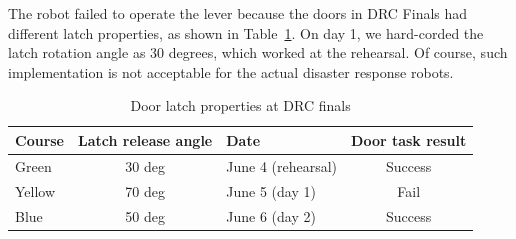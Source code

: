 The robot failed to operate the lever because the doors in DRC Finals had different
latch properties, as shown in Table~\ref{tbl:door_latch}.
On day 1, we hard-corded the latch rotation angle as 30 degrees,
which worked at the rehearsal.
Of course, such implementation is not acceptable for the actual disaster response robots.
%
\begin{table}[htb]
\caption{Door latch properties at DRC finals} \label{tbl:door_latch}
\begin{tabular}{lclc}
\hline
Course & Latch release angle & Date & Door task result  \\ 
\hline
Green & 30 deg & June 4 (rehearsal) & Success  \\
Yellow & 70 deg & June 5 (day 1) & Fail \\
Blue &  50 deg & June 6 (day 2)  & Success \\
\hline
\end{tabular}
\end{table}

